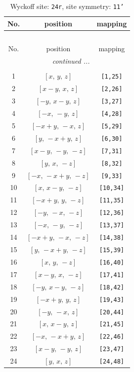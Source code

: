 \documentclass[fleqn,8pt]{jsarticle}
\begin{document}
\begin{longtable}{ccc}
\caption{Wyckoff site: {\tt 24r}, site symmetry: {\tt 11'}}
 \\
 \hline \hline
No. & position & mapping \\ \hline \endfirsthead

\multicolumn{2}{l}{\tablename\ \thetable{}} \\
 \hline \hline
No. & position & mapping \\ \hline \endhead

 \hline \hline
\multicolumn{2}{r}{\footnotesize\it continued ...} \\ \endfoot

 \hline \hline
\multicolumn{2}{r}{} \\ \endlastfoot

1 & $\left[ x,\, y,\, z \right]$ & {\tt [1,25]} \\ \hline
2 & $\left[ x - y,\, x,\, z \right]$ & {\tt [2,26]} \\ \hline
3 & $\left[ - y,\, x - y,\, z \right]$ & {\tt [3,27]} \\ \hline
4 & $\left[ - x,\, - y,\, z \right]$ & {\tt [4,28]} \\ \hline
5 & $\left[ - x + y,\, - x,\, z \right]$ & {\tt [5,29]} \\ \hline
6 & $\left[ y,\, - x + y,\, z \right]$ & {\tt [6,30]} \\ \hline
7 & $\left[ x - y,\, - y,\, - z \right]$ & {\tt [7,31]} \\ \hline
8 & $\left[ y,\, x,\, - z \right]$ & {\tt [8,32]} \\ \hline
9 & $\left[ - x,\, - x + y,\, - z \right]$ & {\tt [9,33]} \\ \hline
10 & $\left[ x,\, x - y,\, - z \right]$ & {\tt [10,34]} \\ \hline
11 & $\left[ - x + y,\, y,\, - z \right]$ & {\tt [11,35]} \\ \hline
12 & $\left[ - y,\, - x,\, - z \right]$ & {\tt [12,36]} \\ \hline
13 & $\left[ - x,\, - y,\, - z \right]$ & {\tt [13,37]} \\ \hline
14 & $\left[ - x + y,\, - x,\, - z \right]$ & {\tt [14,38]} \\ \hline
15 & $\left[ y,\, - x + y,\, - z \right]$ & {\tt [15,39]} \\ \hline
16 & $\left[ x,\, y,\, - z \right]$ & {\tt [16,40]} \\ \hline
17 & $\left[ x - y,\, x,\, - z \right]$ & {\tt [17,41]} \\ \hline
18 & $\left[ - y,\, x - y,\, - z \right]$ & {\tt [18,42]} \\ \hline
19 & $\left[ - x + y,\, y,\, z \right]$ & {\tt [19,43]} \\ \hline
20 & $\left[ - y,\, - x,\, z \right]$ & {\tt [20,44]} \\ \hline
21 & $\left[ x,\, x - y,\, z \right]$ & {\tt [21,45]} \\ \hline
22 & $\left[ - x,\, - x + y,\, z \right]$ & {\tt [22,46]} \\ \hline
23 & $\left[ x - y,\, - y,\, z \right]$ & {\tt [23,47]} \\ \hline
24 & $\left[ y,\, x,\, z \right]$ & {\tt [24,48]} \\
\end{longtable}
\end{document}

